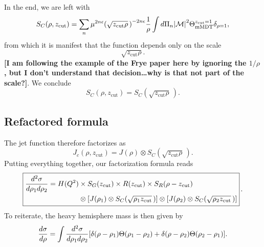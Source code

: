 \documentclass[11pt,twoside,reqno]{amsart}
\theoremstyle{plain}
\theoremstyle{remark}
\theoremstyle{definition}
\theoremstyle{remark}
\theoremstyle{definition}
\theoremstyle{definition}
\newcommand{\cM}{\mathcal{M}}
\newcommand{\zcut}{z_\mathrm{cut}}
\newcommand{\mMDT}{\mathrm{mMDT}}
\begin{document}
	In the end, we are left with
	\begin{equation}
		S_C(\rho, \zcut) = \sum_n \mu^{2n\epsilon} \qty(\sqrt{\zcut \rho}\,)^{-2n\epsilon} \frac{1}{\rho}\int d\Pi_n \abs{\cM}^2 \Theta_\mMDT^{\zcut = 1} \delta_{\rho = 1},
	\end{equation}
	from which it is manifest that the function depends only on the scale
	\begin{equation}
		\sqrt{\zcut \rho}.
	\end{equation}
	{\color{red}\textbf{[I am following the example of the Frye paper here by ignoring the $1/\rho$, but I don't understand that decision\dots why is that not part of the scale?]}}. We conclude
	\begin{equation}
		S_C(\rho, \zcut) = S_C(\sqrt{\zcut \rho}\,).
	\end{equation}

\subsection{Refactored formula}

	The jet function therefore factorizes as
	\begin{equation}
		J_c(\rho, \zcut) = J(\rho)\otimes S_C(\sqrt{\zcut \rho}\,).
	\end{equation}
	Putting everything together, our factorization formula reads
	\begin{equation}
		\boxed{
		\begin{aligned}
			\frac{d^2\sigma}{d\rho_1 d\rho_2} = H(Q^2) &\times S_G(\zcut) \times R(\zcut) \times S_R(\rho - \zcut) \\
			&\otimes \qty[J(\rho_1) \otimes S_C(\sqrt{\rho_1 \zcut}\,)] \otimes \qty[J(\rho_2) \otimes S_C(\sqrt{\rho_2 \zcut}\,)]
		\end{aligned}
		}\,.
	\end{equation}
	To reiterate, the heavy hemisphere mass is then given by
	\begin{equation}
		\frac{d\sigma}{d\rho} = \int \frac{d^2\sigma}{d\rho_1 d\rho_2} \qty[\delta(\rho - \rho_1) \Theta(\rho_1 - \rho_2) + \delta(\rho - \rho_2) \Theta(\rho_2 - \rho_1)].
	\end{equation}




\end{document}
